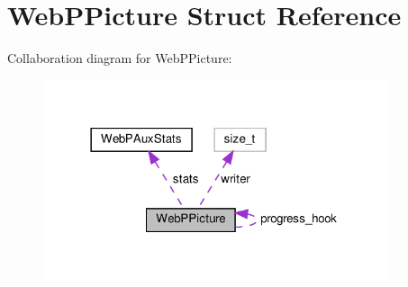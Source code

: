 \hypertarget{structWebPPicture}{}\section{Web\+P\+Picture Struct Reference}
\label{structWebPPicture}


Collaboration diagram for Web\+P\+Picture\+:
\nopagebreak
\begin{figure}[H]
\begin{center}
\leavevmode
\includegraphics[width=285pt]{structWebPPicture__coll__graph}
\end{center}
\end{figure}

